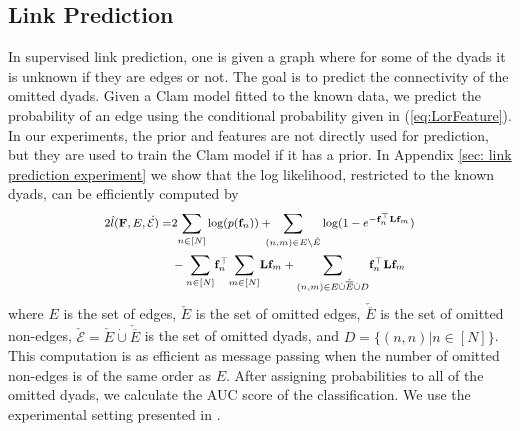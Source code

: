 \documentclass{article}
\theoremstyle{plain}
\theoremstyle{definition}
\theoremstyle{remark}
\newcommand{\dan}[1]{{{\textcolor{blue}{ {#1}\textbf{}}}}}
\begin{document}
\subsection{Link Prediction}
In supervised link prediction, one is given a graph where for  some of the dyads it is unknown if they are edges or not. The goal is to predict the connectivity of the omitted dyads. Given a Clam model fitted to the known data, we predict the probability of an edge using the conditional probability given in (\ref{eq:LorFeature}). In our experiments, the prior and features are not directly used for prediction, but they are used to train the Clam model if it has a prior. %
In Appendix \ref{sec: link prediction experiment} we show that the log likelihood, restricted to the known dyads, can be efficiently computed by
\[\footnotesize
\begin{split}
2\hat{l}(\mathbf{F}, E, \check{\mathcal{E})}=&2\underset{n\in [N]}{\sum} \log(p(\mathbf{f}_n)) 
+ \hspace{-2.0mm}\underset{(n,m)\in E\setminus\check{E}}{\sum} \log(1-e^{-\mathbf{f}_n^\top \mathbf{L} \mathbf{f}_m}) \\
&- \underset{n\in [N]}{\sum} \mathbf{f}_n^\top \underset{m\in [N]}{\sum} \mathbf{L} \mathbf{f}_m
+\underset{(n,m)\in E \dot{\cup} \check{\overline{E}}\dot{\cup}D}{\sum} \mathbf{f}_n^\top \mathbf{L} \mathbf{f}_m
\end{split}
\]
 where $E$ is the set of edges,  $\check{E}$ is the set of omitted edges,  $\check{\overline{E}}$ is the set of omitted non-edges,  $\check{\mathcal{E}}= \check{E}\dot{\cup}\check{\overline{E}}$ is the set of omitted dyads, and $D=\{(n,n)| n\in [N]\}$. %
  This computation is as efficient as message passing when the number of omitted non-edges is of the same order as $E$. 
After assigning probabilities to all of the omitted dyads, we calculate the AUC score of the classification.
We use the experimental setting presented in \cite{zhou2022disenlink}.  
\end{document}
